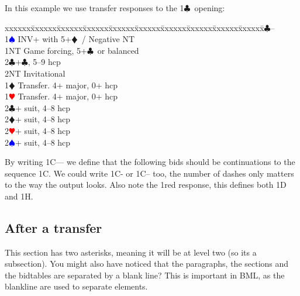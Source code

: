 \documentclass[a4paper]{article}
\newcommand{\BC}{\textcolor{OliveGreen}{$\clubsuit$}}
\newcommand{\BD}{\textcolor{RedOrange}{$\vardiamondsuit$}}
\newcommand{\BH}{\textcolor{Red}{$\varheartsuit${}}}
\newcommand{\BS}{\textcolor{Blue}{$\spadesuit${}}}
\newenvironment{bidtable}
{\begin{tabbing}

xxxxxx\=xxxxxx\=xxxxxx\=xxxxxx\=xxxxxx\=xxxxxx\=xxxxxx\=xxxxxx\=xxxxxx\=xxxxxx\=\kill}
{\end{tabbing} }%
\begin{document}
In this example we use transfer responses to the 1\BC\ opening:

\begin{bidtable}
1\BC--\+\\
1\BS \> INV+ with 5+\BD\ / Negative NT\\
1NT \> Game forcing, 5+\BC\ or balanced\\
2\BC {}+\BC , 5--9 hcp\\
2NT \> Invitational\\
1\BD \> Transfer. 4+ major, 0+ hcp\\
1\BH \> Transfer. 4+ major, 0+ hcp\\
2\BC {}+ suit, 4--8 hcp\\
2\BD {}+ suit, 4--8 hcp\\
2\BH {}+ suit, 4--8 hcp\\
2\BS {}+ suit, 4--8 hcp\-
\end{bidtable}

By writing 1C--- we define that the following bids should be
continuations to the sequence 1C. We could write 1C- or 1C-- too,
the number of dashes only matters to the way the output looks. Also
note the 1red response, this defines both 1D and 1H.

\subsection{After a transfer}

This section has two asterisks, meaning it will be at level two
(so its a subsection). You might also have noticed that the
paragraphs, the sections and the bidtables are separated by a
blank line? This is important in BML, as the blankline are used to
separate elements.
\end{document}
